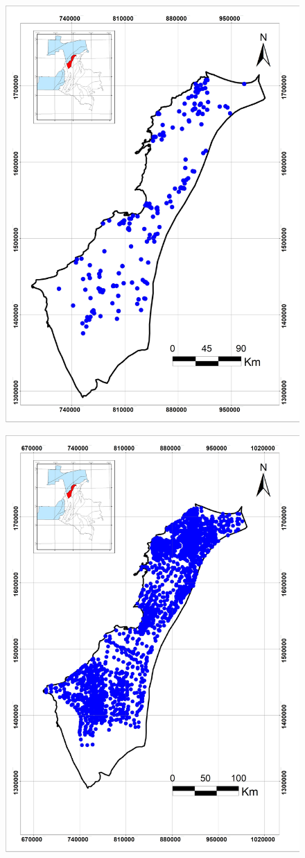 \documentclass{ifacconf}
\begin{document}
\begin{figure}
	\centering
	\includegraphics[width=0.7\linewidth]{"img/Mapa de Pozos"}
	\caption[mapapozos]{}
	\label{fig:mapa-de-pozos}
\end{figure}
\begin{figure}
	\centering
	\includegraphics[width=0.7\linewidth]{"img/Mapa de sismica 2D"}
	\caption[mapasismica2d]{}
	\label{fig:mapa-de-sismica-2d}
\end{figure}
\end{document}
